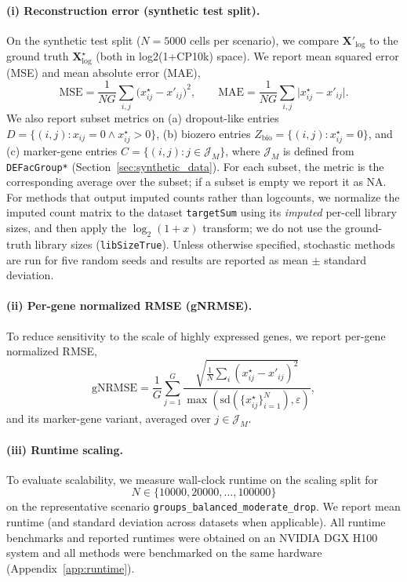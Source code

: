 \documentclass{article}
\theoremstyle{plain}
\theoremstyle{definition}
\theoremstyle{remark}
\begin{document}
\paragraph{(i) Reconstruction error (synthetic test split).}
On the synthetic test split ($N=5000$ cells per scenario), we compare
$\mathbf{X}'_{\log}$ to the ground truth $\mathbf{X}^{\star}_{\log}$ (both in
log2(1+CP10k) space). We report mean squared error (MSE) and mean absolute error
(MAE),
\[
\mathrm{MSE}=\frac{1}{NG}\sum_{i,j}\big(x^{\star}_{ij}-x'_{ij}\big)^2,\qquad
\mathrm{MAE}=\frac{1}{NG}\sum_{i,j}\big|x^{\star}_{ij}-x'_{ij}\big|.
\]
We also report subset metrics on (a) dropout-like entries
$D=\{(i,j):x_{ij}=0\wedge x^{\star}_{ij}>0\}$, (b) biozero entries
$Z_{\mathrm{bio}}=\{(i,j):x^{\star}_{ij}=0\}$, and (c) marker-gene entries
$C=\{(i,j):j\in\mathcal{J}_M\}$, where $\mathcal{J}_M$ is defined from
\texttt{DEFacGroup*} (Section~\ref{sec:synthetic_data}). For each subset, the
metric is the corresponding average over the subset; if a subset is empty we
report it as NA.
For methods that output imputed counts rather than logcounts, we normalize the
imputed count matrix to the dataset \texttt{targetSum} using its \emph{imputed}
per-cell library sizes, and then apply the $\log_2(1+x)$ transform; we do not
use the ground-truth library sizes (\texttt{libSizeTrue}). Unless otherwise
specified, stochastic methods are run for five random seeds and results are
reported as mean $\pm$ standard deviation.

\paragraph{(ii) Per-gene normalized RMSE (gNRMSE).}
To reduce sensitivity to the scale of highly expressed genes, we report
per-gene normalized RMSE,
\[
\mathrm{gNRMSE}=\frac{1}{G}\sum_{j=1}^G\frac{\sqrt{\frac{1}{N}\sum_i\left(x^{\star}_{ij}-x'_{ij}\right)^2}}
{\max\left(\mathrm{sd}(\{x^{\star}_{ij}\}_{i=1}^N),\varepsilon\right)},
\]
and its marker-gene variant, averaged over $j\in\mathcal{J}_M$.

\paragraph{(iii) Runtime scaling.}
To evaluate scalability, we measure wall-clock runtime on the scaling split for
\[
N\in\{10000,20000,\ldots,100000\}
\]
on the representative scenario \texttt{groups\_balanced\_moderate\_drop}. We
report mean runtime (and standard deviation across datasets when applicable).
All runtime benchmarks and reported runtimes were obtained on an NVIDIA DGX
H100 system and all methods were benchmarked on the same hardware
(Appendix~\ref{app:runtime}).
\end{document}
